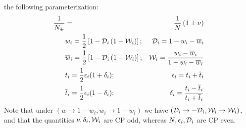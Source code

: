 \documentclass[a4paper,9pt,twoside]{article}
\begin{document}
the following parameterization:
\begin{eqnarray}
\frac{1}{N_\pm} &=& \frac{1}{N}\left( 1 \pm \nu \right) \\
&w_i            = \frac{1}{2}\left[1-{\cal D}_i\left(1-{\cal W}_i\right) \right]; &  {\cal D}_i =1-w_i - \overline{w}_i \\
&\overline{w}_i = \frac{1}{2}\left[1-{\cal D}_i\left(1+{\cal W}_i\right) \right]; &  {\cal W}_i = \frac{ w_i - \overline{w}_i}{1-w_i-\overline{w}_i}\\
&t_i            = \frac{1}{2}\epsilon_i(1+\delta_i);                              &  \epsilon_i = t_i + \overline{t}_i\\
&\overline{t}_i = \frac{1}{2}\epsilon_i(1-\delta_i);                              &  \delta_i = \frac{t_i - \overline{t}_i}{t_i+\overline{t}_i}
\end{eqnarray}
Note that under $(w\rightarrow 1-w_i, \overline{w}_i\rightarrow 1-\overline{w}_i)$ we have $({\cal D}_i \rightarrow -{\cal D}_i,{\cal W}_i\rightarrow{\cal W}_i)$,
and that the quantities $\nu,\delta_i,{\cal W}_i$ are CP odd, whereas $N,\epsilon_i,{\cal D}_i$ are CP even.
\end{document}
